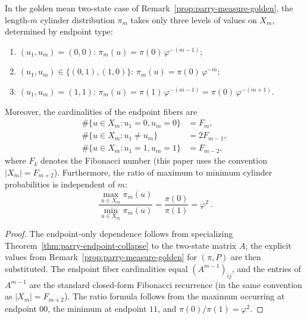 \begin{corollary}\label{cor:parry-golden-three-levels}
In the golden mean two-state case of Remark~\ref{prop:parry-measure-golden}, the length-\(m\) cylinder distribution \(\pi_m\) takes only three levels of values on \(X_m\),
determined by endpoint type:
\begin{enumerate}
  \item \((u_1,u_m)=(0,0)\): \(\pi_m(u)=\pi(0)\,\varphi^{-(m-1)}\);
  \item \((u_1,u_m)\in\{(0,1),(1,0)\}\): \(\pi_m(u)=\pi(0)\,\varphi^{-m}\);
  \item \((u_1,u_m)=(1,1)\): \(\pi_m(u)=\pi(1)\,\varphi^{-(m-1)}=\pi(0)\,\varphi^{-(m+1)}\).
\end{enumerate}
Moreover, the cardinalities of the endpoint fibers are
\[
\begin{aligned}
\#\{u\in X_m:u_1=0,u_m=0\}&=F_m,\\
\#\{u\in X_m:u_1\neq u_m\}&=2F_{m-1},\\
\#\{u\in X_m:u_1=1,u_m=1\}&=F_{m-2},
\end{aligned}
\]
where \(F_k\) denotes the Fibonacci number (this paper uses the convention \(|X_m|=F_{m+2}\)).
Furthermore, the ratio of maximum to minimum cylinder probabilities is independent of \(m\):
\[
\boxed{\ \frac{\max_{u\in X_m}\pi_m(u)}{\min_{u\in X_m}\pi_m(u)}=\frac{\pi(0)}{\pi(1)}=\varphi^2\ }.
\]
\end{corollary}
\begin{proof}
The endpoint-only dependence follows from specializing Theorem~\ref{thm:parry-endpoint-collapse} to the two-state matrix \(A\);
the explicit values from Remark~\ref{prop:parry-measure-golden} for \((\pi,P)\) are then substituted.
The endpoint fiber cardinalities equal \((A^{m-1})_{ij}\), and the entries of \(A^{m-1}\) are the standard closed-form Fibonacci recurrence (in the same convention as \(|X_m|=F_{m+2}\)).
The ratio formula follows from the maximum occurring at endpoint \(00\), the minimum at endpoint \(11\), and \(\pi(0)/\pi(1)=\varphi^2\).
\end{proof}

